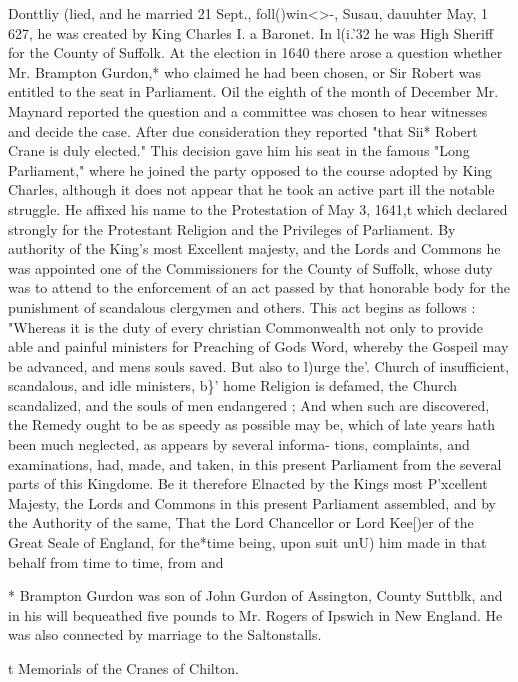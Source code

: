 \documentclass[oneside]{book}
\begin{document}
Donttliy (lied, and he married 21 Sept., foll()win<>-, Susau, dauuhter 
May, 1 627, he was created by King Charles I. a Baronet. In l(i.'32 
he was High Sheriff for the County of Suffolk. At the election 
in 1640 there arose a question whether Mr. Brampton Gurdon,* 
who claimed he had been chosen, or Sir Robert was entitled to 
the seat in Parliament. Oil the eighth of the month of December 
Mr. Maynard reported the question and a committee was chosen 
to hear witnesses and decide the case. After due consideration 
they reported "that Sii* Robert Crane is duly elected." This 
decision gave him his seat in the famous "Long Parliament," 
where he joined the party opposed to the course adopted by King 
Charles, although it does not appear that he took an active part 
ill the notable struggle. He affixed his name to the Protestation 
of May 3, 1641,t which declared strongly for the Protestant 
Religion and the Privileges of Parliament. By authority of the 
King's most Excellent majesty, and the Lords and Commons 
he was appointed one of the Commissioners for the County of 
Suffolk, whose duty was to attend to the enforcement of an act 
passed by that honorable body for the punishment of scandalous 
clergymen and others. This act begins as follows : "Whereas it 
is the duty of every christian Commonwealth not only to provide 
able and painful ministers for Preaching of Gods Word, whereby 
the Gospeil may be advanced, and mens souls saved. But also to 
l)urge the'. Church of insufficient, scandalous, and idle ministers, 
b\}' home Religion is defamed, the Church scandalized, and the 
souls of men endangered ; And when such are discovered, the 
Remedy ought to be as speedy as possible may be, which of late 
years hath been much neglected, as appears by several informa- 
tions, complaints, and examinations, had, made, and taken, in 
this present Parliament from the several parts of this Kingdome. 
Be it therefore Elnacted by the Kings most P'xcellent Majesty, the 
Lords and Commons in this present Parliament assembled, and 
by the Authority of the same, That the Lord Chancellor or Lord 
Kee[)er of the Great Seale of England, for the*time being, upon 
suit unU) him made in that behalf from time to time, from and 



* Brampton Gurdon was son of John Gurdon of Assington, County 
Suttblk, and in his will bequeathed five pounds to Mr. Rogers of Ipswich 
in New England. He was also connected by marriage to the Saltonstalls. 

t Memorials of the Cranes of Chilton. 
\end{document}
